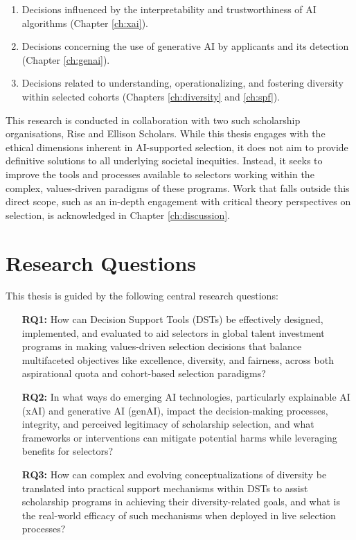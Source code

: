 \begin{enumerate}
    \item Decisions influenced by the interpretability and trustworthiness of AI algorithms (Chapter \ref{ch:xai}).
    \item Decisions concerning the use of generative AI by applicants and its detection (Chapter \ref{ch:genai}).
    \item Decisions related to understanding, operationalizing, and fostering diversity within selected cohorts (Chapters \ref{ch:diversity} and \ref{ch:spf}).
\end{enumerate}

This research is conducted in collaboration with two such scholarship organisations, Rise and Ellison Scholars. While this thesis engages with the ethical dimensions inherent in AI-supported selection, it does not aim to provide definitive solutions to all underlying societal inequities. Instead, it seeks to improve the tools and processes available to selectors working within the complex, values-driven paradigms of these programs. Work that falls outside this direct scope, such as an in-depth engagement with critical theory perspectives on selection, is acknowledged in Chapter \ref{ch:discussion}.

\section{Research Questions}

This thesis is guided by the following central research questions:

\begin{enumerate}
    \item[\textbf{RQ1:}] How can Decision Support Tools (DSTs) be effectively designed, implemented, and evaluated to aid selectors in global talent investment programs in making values-driven selection decisions that balance multifaceted objectives like excellence, diversity, and fairness, across both aspirational quota and cohort-based selection paradigms?
    \item[\textbf{RQ2:}] In what ways do emerging AI technologies, particularly explainable AI (xAI) and generative AI (genAI), impact the decision-making processes, integrity, and perceived legitimacy of scholarship selection, and what frameworks or interventions can mitigate potential harms while leveraging benefits for selectors?
    \item[\textbf{RQ3:}] How can complex and evolving conceptualizations of diversity be translated into practical support mechanisms within DSTs to assist scholarship programs in achieving their diversity-related goals, and what is the real-world efficacy of such mechanisms when deployed in live selection processes?
\end{enumerate}

